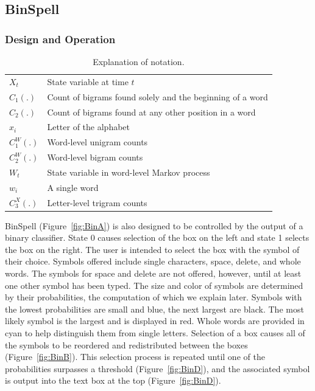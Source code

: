 \documentclass[12pt,titlepage]{article}
\begin{document}
\subsection{BinSpell}

\subsubsection{Design and Operation}

\begin{table}
\caption{Explanation of notation.}
\begin{center}
\begin{tabular}{ll}
\hline\hline
$X_t$ & State variable at time $t$ \\
$C_1(.)$ & Count of bigrams found solely and the beginning of a word \\
$C_2(.)$ & Count of bigrams found at any other position in a word \\
$x_i$ & Letter of the alphabet \\
$C_1^W(.)$ & Word-level unigram counts \\
$C_2^W(.)$ & Word-level bigram counts \\
$W_t$ & State variable in word-level Markov process \\
$w_i$ & A single word \\
$C_3^X(.)$ & Letter-level trigram counts \\
\hline\hline
\end{tabular}
\end{center}
\label{table:Not}
\end{table}

BinSpell (Figure~\ref{fig:BinA}) is also designed to be controlled by the output of a binary classifier.  State 0 causes 
selection of the box on the left and state 1 selects the box on the right.  The user is intended to select the 
box with the symbol of their choice.  Symbols offered include single characters, space, delete, and 
whole words.  The symbols for space and delete are not offered, however, until at least one other 
symbol has been typed.  The size and color of symbols are determined by their probabilities, the 
computation of which we explain later.  Symbols with the lowest probabilities are small and blue, the 
next largest are black.  The most likely symbol is the largest and is displayed in red.  Whole words are 
provided in cyan to help distinguish them from single letters.  Selection of a box causes all of the 
symbols to be reordered and redistributed between the boxes (Figure~\ref{fig:BinB}).  This selection process is repeated 
until one of the probabilities surpasses a threshold (Figure~\ref{fig:BinD}), and the associated symbol is output into the text box 
at the top (Figure~\ref{fig:BinD}). 
\end{document}
